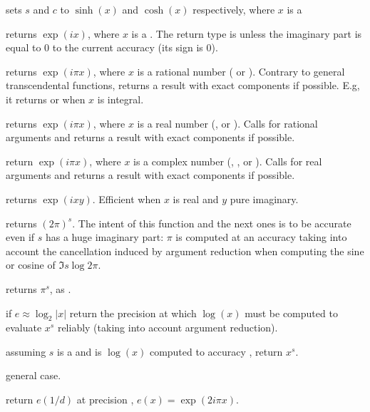  sets $s$ and $c$ to
$\sinh(x)$ and $\cosh(x)$ respectively, where $x$ is a 

 returns $\exp(ix)$, where $x$ is a .
The return type is  unless the imaginary part is equal to $0$
to the current accuracy (its sign is $0$).

 returns $\exp(i \pi x)$, where $x$ is a
rational number ( or ). Contrary to general transcendental
functions,  returns a result with exact components if possible.
E.g, it returns  or  when $x$ is integral.

 returns $\exp(i \pi x)$, where $x$ is a
real number (,  or ). Calls  for
rational arguments and returns a result with exact components if possible.

 return $\exp(i \pi x)$, where $x$ is a
complex number (, ,  or ).
Calls  for real arguments and returns a result with exact
components if possible.

 returns $\exp(ixy)$. Efficient
when $x$ is real and $y$ pure imaginary.

 returns $(2\pi)^s$. The intent of this
function and the next ones is to be accurate even if $s$ has a huge imaginary
part: $\pi$ is computed at an accuracy taking into account the cancellation
induced by argument reduction when computing the sine or cosine of
$\Im s \log 2\pi$.

 returns $\pi^s$, as .

 if $e \approx \log_2 |x|$
return the precision at which $\log(x)$ must be computed to evaluate $x^s$
reliably (taking into account argument reduction).

 assuming $s$ is a
 and  is $\log(x)$ computed to accuracy
, return $x^s$.

 general case.

 return $e(1/d)$ at precision
, $e(x) = \exp(2i\pi x)$.


